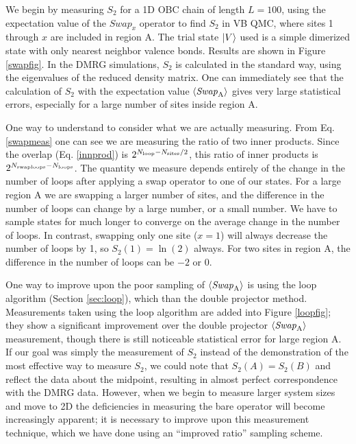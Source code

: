 We begin by measuring $S_2$ for a 1D OBC chain of length $L=100$, using the expectation value of the $Swap_x$ operator to find $S_2$ in VB QMC, where sites 1 through $x$ are included in region A. 
The trial state $\lvert {V} \rangle$ used is a simple dimerized state with only nearest neighbor valence bonds.
Results are shown in Figure \ref{swapfig}.
In the DMRG simulations, $S_2$ is calculated in the standard way, using the eigenvalues of the reduced density matrix. 
One can immediately see that the calculation of $S_2$ with the expectation value $\langle {\it Swap}_{\rm A} \rangle$ gives very large statistical errors, especially for a large number of sites inside region A.

One way to understand to consider what we are actually measuring.
From Eq. \eqref{swapmeas} one can see we are measuring the ratio of two inner products.
Since the overlap (Eq. \eqref{innprod}) is $2^{N_{\rm loop} - N_{\rm sites}/2}$, this ratio of inner products is $2^{N_{\rm swaploops} - N_{\rm loops}}$.
The quantity we measure depends entirely of the change in the number of loops after applying a swap operator to one of our states. 
For a large region A we are swapping a larger number of sites, and the difference in the number of loops can change by a large number, or a small number. 
We have to sample states for much longer to converge on the average change in the number of loops.
In contrast, swapping only one site ($x=1$) will always decrease the number of loops by 1, so $S_2(1)=\ln(2)$ always.
For two sites in region A, the difference in the number of loops can be $-2$ or 0.  

One way to improve upon the poor sampling of  $\langle {\it Swap}_{\rm A} \rangle$ is using the loop algorithm (Section \ref{sec:loop}), which  than the double projector method.
Measurements taken using the loop algorithm are added into Figure \ref{loopfig}; they show a significant improvement over the double projector $\langle {\it Swap}_{\rm A} \rangle$ measurement, 
though there is still noticeable statistical error for large region A.
If our goal was simply the measurement of $S_2$ instead of the demonstration of the most effective way to measure $S_2$, we could note that $S_2(A) = S_2(B)$ and reflect the data about the midpoint, resulting in almost perfect correspondence with the DMRG data.
However, when we begin to measure larger system sizes and move to 2D the deficiencies in measuring the bare \swa operator will become increasingly apparent; it is necessary to improve upon this measurement technique, which we have done using an ``improved ratio'' sampling scheme.




